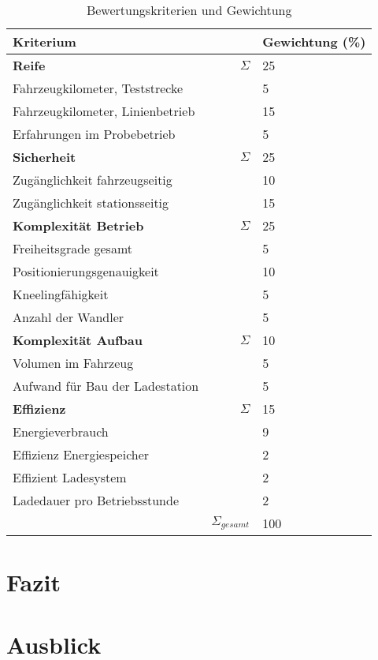 \begin{table}
	\centering
	\begin{tabularx}{\linewidth}{Xrl}
		\toprule
		Kriterium                        &                   & Gewichtung (\%) \\ \midrule
		\textbf{Reife}                   & $\Sigma$          & 25                    \\
		Fahrzeugkilometer, Teststrecke   &                   & 5                     \\
		Fahrzeugkilometer, Linienbetrieb &                   & 15                    \\
		Erfahrungen im Probebetrieb      &                   & 5                     \\ \midrule
		\textbf{Sicherheit}              & $\Sigma$          & 25                    \\
		Zugänglichkeit fahrzeugseitig    &                   & 10                    \\
		Zugänglichkeit stationsseitig    &                   & 15                    \\ \midrule
		\textbf{Komplexität Betrieb}     & $\Sigma$          & 25                    \\
		Freiheitsgrade gesamt            &                   & 5                     \\
		Positionierungsgenauigkeit       &                   & 10                    \\
		Kneelingfähigkeit                &                   & 5                     \\
		Anzahl der Wandler               &                   & 5                     \\ \midrule
		\textbf{Komplexität Aufbau}      & $\Sigma$          & 10                    \\
		Volumen im Fahrzeug              &                   & 5                     \\
		Aufwand für Bau der Ladestation  &                   & 5                     \\ \midrule
		\textbf{Effizienz}               & $\Sigma$          & 15                    \\
		Energieverbrauch                 &                   & 9                     \\
		Effizienz Energiespeicher        &                   & 2                     \\
		Effizient Ladesystem             &                   & 2                     \\
		Ladedauer pro Betriebsstunde     &                   & 2                     \\ \bottomrule
		                                 & $\Sigma_{gesamt}$ & 100
	\end{tabularx}
	\label{tab_bewertungskriterien}
	\caption{Bewertungskriterien und Gewichtung}
\end{table} 




\section{Fazit}
\section{Ausblick}